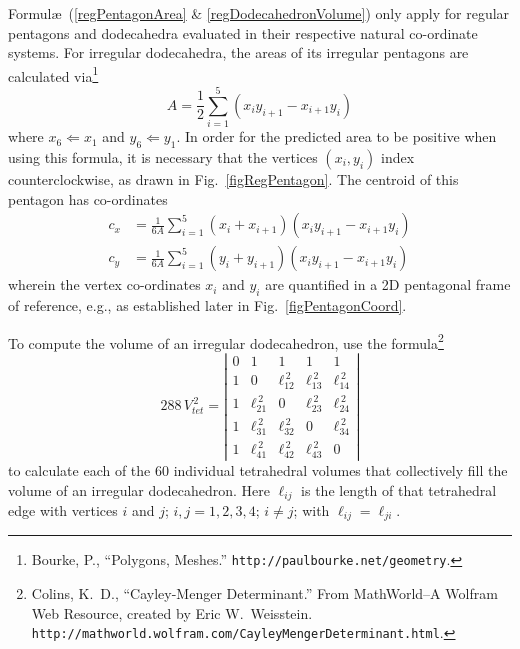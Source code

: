 Formul\ae\ (\ref{regPentagonArea} \& \ref{regDodecahedronVolume}) only apply for regular pentagons and dodecahedra evaluated in their respective natural co-ordinate systems.  For irregular dodecahedra, the areas of its irregular pentagons are calculated via\footnote{
	Bourke, P., ``Polygons, Meshes.'' \texttt{http://paulbourke.net/geometry}.
}
\begin{equation}
	A = \frac{1}{2} \sum_{i=1}^5 ( x_i y_{i+1} - x_{i+1} y_i)
	\label{irregularPentagonArea}
\end{equation}
where $x_6 \Leftarrow x_1$ and $y_6 \Leftarrow y_1$.  In order for the predicted area to be positive when using this formula, it is necessary that the vertices $(x_i , y_i)$ index counterclockwise, as drawn in Fig.~\ref{figRegPentagon}.  The centroid of this pentagon has co-ordinates\footnotemark[\value{footnote}]
\begin{subequations}
	\label{centroidPentagon}
	\begin{align}
		c_x & = \frac{1}{6 A} \sum_{i=1}^5 (x_i + x_{i+1})
			( x_i y_{i+1} - x_{i+1} y_i) \\
		c_y & = \frac{1}{6 A} \sum_{i=1}^5 (y_i + y_{i+1})
		( x_i y_{i+1} - x_{i+1} y_i)
	\end{align}
\end{subequations}
wherein the vertex co-ordinates $x_i$ and $y_i$ are quantified in a 2D pentagonal frame of reference, e.g., as established later in Fig.~\ref{figPentagonCoord}.

To compute the volume of an irregular dodecahedron, use the formula\footnote{
	Colins, K.~D., ``Cayley-Menger Determinant.'' From MathWorld--A Wolfram Web Resource, created by Eric W.\ Weisstein. \texttt{http://mathworld.wolfram.com/Cayley\-MengerDeterminant.html}.
}
\begin{equation}
	288 \, V^{\,2}_{tet} = \left| \begin{matrix}
	0 & 1 & 1 & 1 & 1 \\
	1 & 0 & \ell_{12}^{\,2} & \ell_{13}^{\,2} & \ell_{14}^{\,2} \\
	1 & \ell_{21}^{\,2} & 0 & \ell_{23}^{\,2} & \ell_{24}^{\,2} \\
	1 & \ell_{31}^{\,2} & \ell_{32}^{\,2} & 0 & \ell_{34}^{\,2} \\
	1 & \ell_{41}^{\,2} & \ell_{42}^{\,2} & \ell_{43}^{\,2} & 0
	\end{matrix} \right|
	\label{tetrahedralVolume}
\end{equation}
to calculate each of the 60 individual tetrahedral volumes that collectively fill the volume of an irregular dodecahedron.  Here $\ell_{ij}$ is the length of that tetrahedral edge with vertices $i$ and $j$; $i, j = 1, 2, 3, 4$; $i \neq j$; with $\ell_{ij} = \ell_{ji}$.

